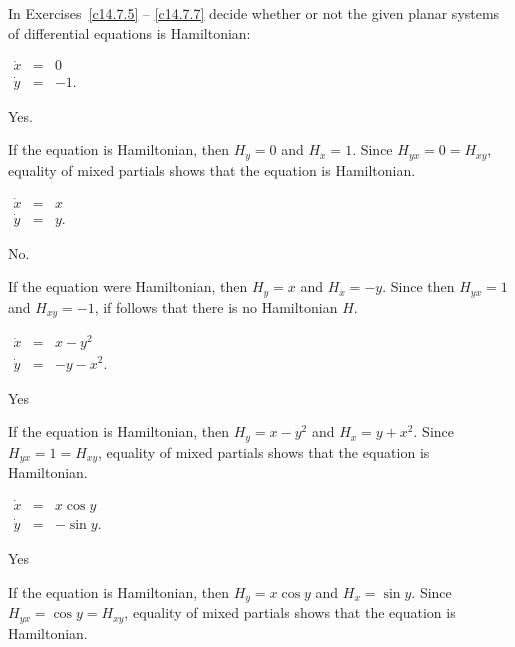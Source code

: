 \documentclass{ximera}
\begin{document}
\noindent In Exercises~\ref{c14.7.5} -- \ref{c14.7.7} decide whether or not  
the given planar systems of differential equations is Hamiltonian:
\begin{exercise} \label{c14.7.5}
$\begin{array}{rcl}
\dot{x} & = & 0 \\
\dot{y} & = & -1.
\end{array}$

\begin{solution}
\ans Yes.

\soln If the equation is Hamiltonian, then $H_y=0$ and $H_x=1$.  Since 
$H_{yx}=0=H_{xy}$, equality of mixed partials shows that the equation is
Hamiltonian.

\end{solution}
\end{exercise}
\begin{exercise} \label{c14.7.6}
$\begin{array}{rcl}
\dot{x} & = & x\\
\dot{y} & = & y.
\end{array}$

\begin{solution}
\ans No.

\soln If the equation were Hamiltonian, then $H_y=x$ and $H_x=-y$.  Since 
then $H_{yx}=1$ and $H_{xy}=-1$, if follows that there is no Hamiltonian $H$. 

\end{solution}
\end{exercise}
\begin{exercise} \label{c14.7.6a}
$\begin{array}{rcl}
\dot{x} & = & x - y^2\\
\dot{y} & = & -y - x^2.
\end{array}$

\begin{solution}
\ans Yes

\soln  If the equation is Hamiltonian, then $H_y=x-y^2$ and $H_x=y+x^2$.  
Since $H_{yx}=1=H_{xy}$, equality of mixed partials shows that the equation 
is Hamiltonian.

\end{solution}
\end{exercise}
\begin{exercise} \label{c14.7.7}
$\begin{array}{rcl}
\dot{x} & = & x\cos y\\
\dot{y} & = & -\sin y.
\end{array}$

\begin{solution}
\ans Yes

\soln  If the equation is Hamiltonian, then $H_y=x\cos y$ and $H_x=\sin y$.  
Since $H_{yx}=\cos y =H_{xy}$, equality of mixed partials shows that the 
equation is Hamiltonian.


\end{solution}
\end{exercise}
\end{document}
